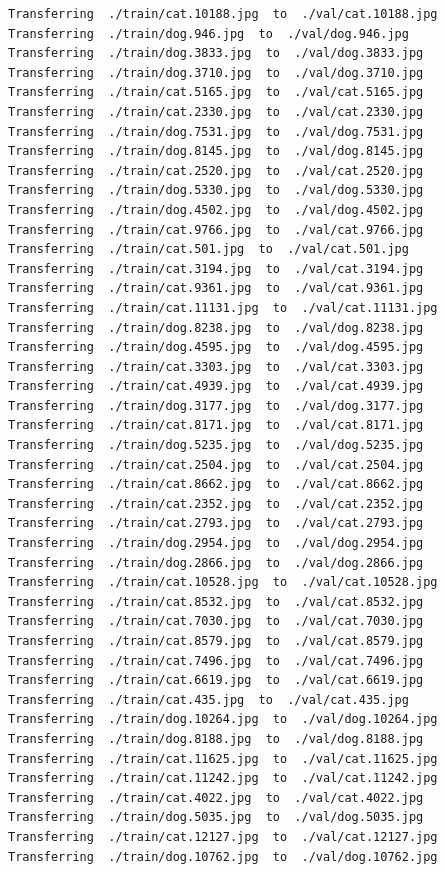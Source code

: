 \documentclass[]{book}
\theoremstyle{definition}
\theoremstyle{definition}
\theoremstyle{definition}
\theoremstyle{remark}
\begin{document}
\begin{verbatim}
Transferring  ./train/cat.10188.jpg  to  ./val/cat.10188.jpg
Transferring  ./train/dog.946.jpg  to  ./val/dog.946.jpg
Transferring  ./train/dog.3833.jpg  to  ./val/dog.3833.jpg
Transferring  ./train/dog.3710.jpg  to  ./val/dog.3710.jpg
Transferring  ./train/cat.5165.jpg  to  ./val/cat.5165.jpg
Transferring  ./train/cat.2330.jpg  to  ./val/cat.2330.jpg
Transferring  ./train/dog.7531.jpg  to  ./val/dog.7531.jpg
Transferring  ./train/dog.8145.jpg  to  ./val/dog.8145.jpg
Transferring  ./train/cat.2520.jpg  to  ./val/cat.2520.jpg
Transferring  ./train/dog.5330.jpg  to  ./val/dog.5330.jpg
Transferring  ./train/dog.4502.jpg  to  ./val/dog.4502.jpg
Transferring  ./train/cat.9766.jpg  to  ./val/cat.9766.jpg
Transferring  ./train/cat.501.jpg  to  ./val/cat.501.jpg
Transferring  ./train/cat.3194.jpg  to  ./val/cat.3194.jpg
Transferring  ./train/cat.9361.jpg  to  ./val/cat.9361.jpg
Transferring  ./train/cat.11131.jpg  to  ./val/cat.11131.jpg
Transferring  ./train/dog.8238.jpg  to  ./val/dog.8238.jpg
Transferring  ./train/dog.4595.jpg  to  ./val/dog.4595.jpg
Transferring  ./train/cat.3303.jpg  to  ./val/cat.3303.jpg
Transferring  ./train/cat.4939.jpg  to  ./val/cat.4939.jpg
Transferring  ./train/dog.3177.jpg  to  ./val/dog.3177.jpg
Transferring  ./train/cat.8171.jpg  to  ./val/cat.8171.jpg
Transferring  ./train/dog.5235.jpg  to  ./val/dog.5235.jpg
Transferring  ./train/cat.2504.jpg  to  ./val/cat.2504.jpg
Transferring  ./train/cat.8662.jpg  to  ./val/cat.8662.jpg
Transferring  ./train/cat.2352.jpg  to  ./val/cat.2352.jpg
Transferring  ./train/cat.2793.jpg  to  ./val/cat.2793.jpg
Transferring  ./train/dog.2954.jpg  to  ./val/dog.2954.jpg
Transferring  ./train/dog.2866.jpg  to  ./val/dog.2866.jpg
Transferring  ./train/cat.10528.jpg  to  ./val/cat.10528.jpg
Transferring  ./train/cat.8532.jpg  to  ./val/cat.8532.jpg
Transferring  ./train/cat.7030.jpg  to  ./val/cat.7030.jpg
Transferring  ./train/cat.8579.jpg  to  ./val/cat.8579.jpg
Transferring  ./train/cat.7496.jpg  to  ./val/cat.7496.jpg
Transferring  ./train/cat.6619.jpg  to  ./val/cat.6619.jpg
Transferring  ./train/cat.435.jpg  to  ./val/cat.435.jpg
Transferring  ./train/dog.10264.jpg  to  ./val/dog.10264.jpg
Transferring  ./train/dog.8188.jpg  to  ./val/dog.8188.jpg
Transferring  ./train/cat.11625.jpg  to  ./val/cat.11625.jpg
Transferring  ./train/cat.11242.jpg  to  ./val/cat.11242.jpg
Transferring  ./train/cat.4022.jpg  to  ./val/cat.4022.jpg
Transferring  ./train/dog.5035.jpg  to  ./val/dog.5035.jpg
Transferring  ./train/cat.12127.jpg  to  ./val/cat.12127.jpg
Transferring  ./train/dog.10762.jpg  to  ./val/dog.10762.jpg

\end{verbatim}
\end{document}
